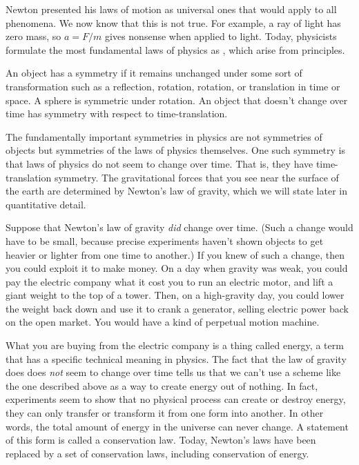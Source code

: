 Newton presented his laws of motion as universal ones that would
apply to all phenomena. We now know that this is not true. For
example, a ray of light has zero mass, so $a=F/m$ gives nonsense
when applied to light. Today, physicists formulate the most fundamental
laws of physics as ,
which arise from  principles.

An object has a symmetry if it remains unchanged under some sort
of transformation such as a reflection, rotation, rotation, or translation
in time or space. A sphere is symmetric under rotation. An object that
doesn't change over time has symmetry with respect to time-translation.


The fundamentally important symmetries in physics are not symmetries of
objects but symmetries of the laws of physics themselves.
One such symmetry is that laws of physics do not
seem to change over time. That is, they have time-translation symmetry.
The gravitational forces that you see near the surface of the earth are
determined by Newton's law of gravity, which we will state later in quantitative detail.

Suppose that Newton's law of gravity \emph{did} change over time. (Such a
change would have to be small, because precise experiments haven't shown objects
to get heavier or lighter from one time to another.) If you knew of such a change,
then you could exploit it to make money. On a day when gravity was weak, you could
pay the electric company what it cost you to run an electric motor, and lift a giant
weight to the top of a tower. Then, on a high-gravity day, you could lower the weight
back down and use it to crank a generator, selling electric power back on the open market.
You would have a kind of perpetual motion machine.

\timetraveltohere

What you are buying from the electric company is a thing called energy, a term that
has a specific technical meaning in physics. The fact that the law of gravity does
does \emph{not} seem to change over time tells us that we can't use a scheme like
the one described above as a way to create energy out of nothing. In fact, experiments
seem to show that no physical process can create or destroy energy, they can only
transfer or transform it from one form into another.
In other words, the total amount of energy in the universe can never change. A statement
of this form is called a conservation law.
Today, Newton's laws have been replaced by a set of conservation laws, including
conservation of energy.


